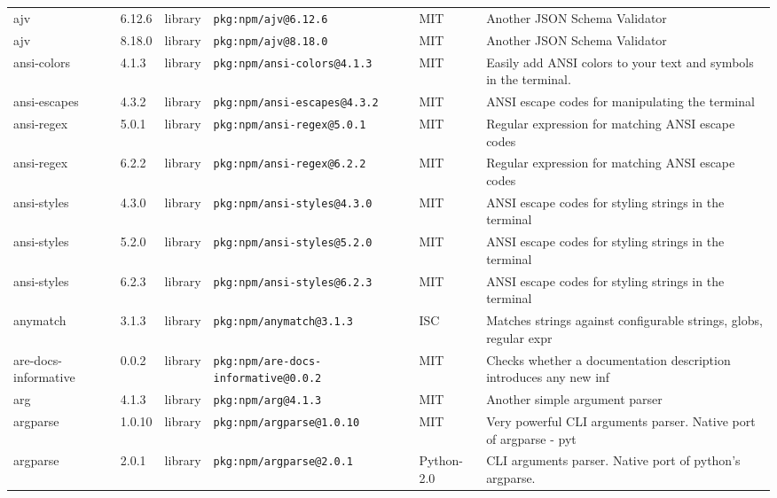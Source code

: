 \documentclass[11pt,a4paper]{article}
\begin{document}
\begin{longtable}{|p{4cm}|p{2cm}|p{1.6cm}|p{5cm}|p{1.5cm}|p{3.5cm}|}
\raggedright ajv & 6.12.6 & library & \small\texttt{pkg:npm/ajv@6.12.6} & MIT & \small Another JSON Schema Validator \\
\raggedright ajv & 8.18.0 & library & \small\texttt{pkg:npm/ajv@8.18.0} & MIT & \small Another JSON Schema Validator \\
\raggedright ansi-colors & 4.1.3 & library & \small\texttt{pkg:npm/ansi-colors@4.1.3} & MIT & \small Easily add ANSI colors to your text and symbols in the terminal.  \\
\raggedright ansi-escapes & 4.3.2 & library & \small\texttt{pkg:npm/ansi-escapes@4.3.2} & MIT & \small ANSI escape codes for manipulating the terminal \\
\raggedright ansi-regex & 5.0.1 & library & \small\texttt{pkg:npm/ansi-regex@5.0.1} & MIT & \small Regular expression for matching ANSI escape codes \\
\raggedright ansi-regex & 6.2.2 & library & \small\texttt{pkg:npm/ansi-regex@6.2.2} & MIT & \small Regular expression for matching ANSI escape codes \\
\raggedright ansi-styles & 4.3.0 & library & \small\texttt{pkg:npm/ansi-styles@4.3.0} & MIT & \small ANSI escape codes for styling strings in the terminal \\
\raggedright ansi-styles & 5.2.0 & library & \small\texttt{pkg:npm/ansi-styles@5.2.0} & MIT & \small ANSI escape codes for styling strings in the terminal \\
\raggedright ansi-styles & 6.2.3 & library & \small\texttt{pkg:npm/ansi-styles@6.2.3} & MIT & \small ANSI escape codes for styling strings in the terminal \\
\raggedright anymatch & 3.1.3 & library & \small\texttt{pkg:npm/anymatch@3.1.3} & ISC & \small Matches strings against configurable strings, globs, regular expr \\
\raggedright are-docs-informative & 0.0.2 & library & \small\texttt{pkg:npm/are-docs-informative@0.0.2} & MIT & \small Checks whether a documentation description introduces any new inf \\
\raggedright arg & 4.1.3 & library & \small\texttt{pkg:npm/arg@4.1.3} & MIT & \small Another simple argument parser \\
\raggedright argparse & 1.0.10 & library & \small\texttt{pkg:npm/argparse@1.0.10} & MIT & \small Very powerful CLI arguments parser. Native port of argparse - pyt \\
\raggedright argparse & 2.0.1 & library & \small\texttt{pkg:npm/argparse@2.0.1} & Python-2.0 & \small CLI arguments parser. Native port of python's argparse. \\

\end{longtable}
\end{document}
